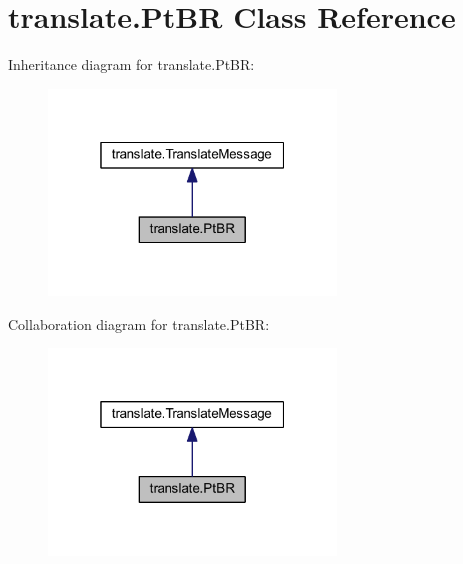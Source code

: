 \hypertarget{classtranslate_1_1_pt_b_r}{}\section{translate.\+Pt\+BR Class Reference}
\label{classtranslate_1_1_pt_b_r}


Inheritance diagram for translate.\+Pt\+BR\+:\nopagebreak
\begin{figure}[H]
\begin{center}
\leavevmode
\includegraphics[width=217pt]{classtranslate_1_1_pt_b_r__inherit__graph}
\end{center}
\end{figure}


Collaboration diagram for translate.\+Pt\+BR\+:\nopagebreak
\begin{figure}[H]
\begin{center}
\leavevmode
\includegraphics[width=217pt]{classtranslate_1_1_pt_b_r__coll__graph}
\end{center}
\end{figure}
